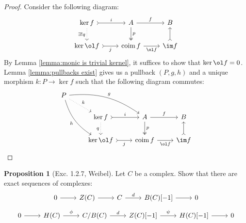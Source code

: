 \documentclass[12pt]{amsart}
\DeclareMathOperator{\coim}{coim}
\theoremstyle{definition}
\newtheorem{proposition}{Proposition}
\begin{document}
\begin{proof}
  Consider the following diagram:
  \[
    \begin{tikzcd}
      \ker f\ar[r,tail,"i"]\ar[d,dotted,"\exists!q"'] & A\ar[d,twoheadrightarrow,"p"]\ar[r,"f"]
                            & B\\%
      \ker \ol f\ar[r,tail,"j"']& \coim f\ar[r, "\ol f"'] & \im f\ar[u,tail,]
    \end{tikzcd}
  \] 
  By Lemma \ref{lemma:monic is trivial kernel}, it suffices to show that $\ker \ol f=0$.
  Lemma \ref{lemma:pullbacks exist} gives us a pullback $(P,g,h)$ and a unique morphism $k:P\to \ker f$ such that the following diagram commutes:
  \[
    \begin{tikzcd}
      P\ar[ddr,bend right =20, "h"']\ar[drr,bend left = 20, "g"]\ar[dr,dotted,"k"]\\
      &\ker f\ar[r,tail,"i"]\ar[d,dotted,"q"'] & A\ar[d,twoheadrightarrow,"p"]\ar[r,"f"]
                            & B\\%
      &\ker \ol f\ar[r,tail,"j"']& \coim f\ar[r, "\ol f"'] & \im f\ar[u,tail,]
    \end{tikzcd}
  \] 
\end{proof}

\begin{proposition}[Exc. 1.2.7, Weibel]
  Let $C$ be a complex. %
  Show that there are exact sequences of complexes:
  \begin{equation}
    \begin{tikzcd}
      0\ar[r] & Z(C)\ar[r] & C\ar[r,"d"] & B(C)[-1]\ar[r] & 0
    \end{tikzcd}
  \end{equation}
  \begin{equation}
    \begin{tikzcd}
      0\ar[r] & H(C)\ar[r,"\phi"] & C/B(C)\ar[r,"d"] & Z(C)[-1]\ar[r,"\psi"] & H(C)[-1]\ar[r] & 0
    \end{tikzcd}
  \end{equation}
\end{proposition}
\end{document}
